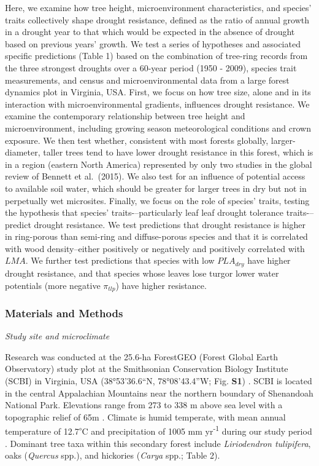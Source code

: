 \documentclass[
]{article}
\begin{document}
Here, we examine how tree height, microenvironment characteristics, and
species' traits collectively shape drought resistance, defined as the
ratio of annual growth in a drought year to that which would be expected
in the absence of drought based on previous years' growth. We test a
series of hypotheses and associated specific predictions (Table 1) based
on the combination of tree-ring records from the three strongest
droughts over a 60-year period (1950 - 2009), species trait
measurements, and census and microenvironmental data from a large forest
dynamics plot in Virginia, USA. First, we focus on how tree size, alone
and in its interaction with microenvironmental gradients, influences
drought resistance. We examine the contemporary relationship between
tree height and microenvironment, including growing season
meteorological conditions and crown exposure. We then test whether,
consistent with most forests globally, larger-diameter, taller trees
tend to have lower drought resistance in this forest, which is in a
region (eastern North America) represented by only two studies in the
global review of Bennett et al.~(2015). We also test for an influence of
potential access to available soil water, which should be greater for
larger trees in dry but not in perpetually wet microsites. Finally, we
focus on the role of species' traits, testing the hypothesis that
species' traits-\/--particularly leaf leaf drought tolerance
traits-\/--predict drought resistance. We test predictions that drought
resistance is higher in ring-porous than semi-ring and diffuse-porous
species and that it is correlated with wood density--either positively
\citep{greenwood_tree_2017} or negatively
\citep{hoffmann_hydraulic_2011} and positively correlated with \(LMA\).
We further test predictions that species with low \(PLA_{dry}\) have
higher drought resistance, and that species whose leaves lose turgor
lower water potentials (more negative \(\pi_{tlp}\)) have higher
resistance.

\hypertarget{materials-and-methods}{%
\subsubsection{Materials and Methods}\label{materials-and-methods}}

\emph{Study site and microclimate}

Research was conducted at the 25.6-ha ForestGEO (Forest Global Earth
Observatory) study plot at the Smithsonian Conservation Biology
Institute (SCBI) in Virginia, USA (38°53'36.6``N, 78°08'43.4''W; Fig.
\textbf{S1})
\citep{bourg_initial_2013, andersonteixeira_ctfs-forestgeo:_2015}. SCBI
is located in the central Appalachian Mountains near the northern
boundary of Shenandoah National Park. Elevations range from 273 to 338 m
above sea level with a topographic relief of 65m
\citep{bourg_initial_2013}. Climate is humid temperate, with mean annual
temperature of 12.7\textsuperscript{\(\circ\)}C and precipitation of
1005 mm yr\textsuperscript{-1} during our study period \citep[1960-2009;
source: CRU TS v.4.01;][]{harris_updated_2014}. Dominant tree taxa
within this secondary forest include \emph{Liriodendron tulipifera},
oaks (\emph{Quercus} spp.), and hickories (\emph{Carya} spp.; Table 2).
\end{document}
